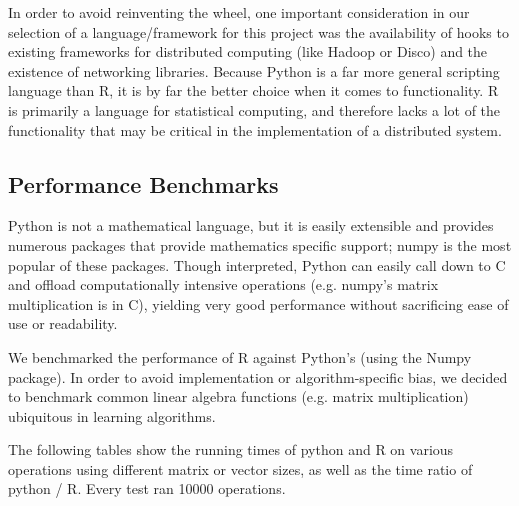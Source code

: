 \documentclass[%
  final,
  notitlepage,
  narroweqnarray,
  inline,
]{ieee}
\begin{document}
In order to avoid reinventing the wheel, one important consideration in our
selection of a language/framework for this project was the availability of hooks
to existing frameworks for distributed computing (like Hadoop or Disco) and the
existence of networking libraries. Because Python is a far more general
scripting language than R, it is by far the better choice when it comes to
functionality. R is primarily a language for statistical computing, and
therefore lacks a lot of the functionality that may be critical in the
implementation of a distributed system.

\subsection{Performance Benchmarks}

Python is not a mathematical language, but it is easily extensible and provides
numerous packages that provide mathematics specific support; numpy is the most
popular of these packages. Though interpreted, Python can easily call down to C
and offload computationally intensive operations (e.g. numpy's matrix
multiplication is in C), yielding very good performance without sacrificing ease
of use or readability.

We benchmarked the performance of R against Python's (using the Numpy package).
In order to avoid implementation or algorithm-specific bias, we decided to
benchmark common linear algebra functions (e.g. matrix multiplication)
ubiquitous in learning algorithms.

The following tables show the running times of python and R on various
operations using different matrix or vector sizes, as well as the time ratio of
python / R. Every test ran 10000 operations.
\end{document}
